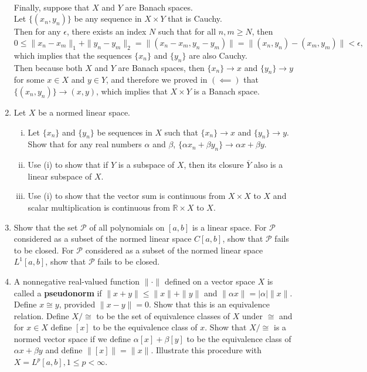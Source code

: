 \begin{enumerate}
    \\Finally, suppose that $X$ and $Y$ are Banach spaces.
    \\Let $\{(x_n,y_n)\}$ be any sequence in $X\times Y$ that is Cauchy.
    \\Then for any $\epsilon$, there exists an index $N$ such that for all $n,m\ge N$, then
    \[
        0\le\|x_n-x_m\|_1+\|y_n-y_m\|_2=\|(x_n-x_m,y_n-y_m)\|=\|(x_n,y_n)-(x_m,y_m)\|<\epsilon,
    \]
    which implies that the sequences $\{x_n\}$ and $\{y_n\}$ are also Cauchy.
    \\Then because both $X$ and $Y$ are Banach spaces, then $\{x_n\}\to x$ and $\{y_n\}\to y$ for some $x\in X$ and $y\in Y$, and therefore we proved in $(\impliedby)$ that $\{(x_n,y_n)\}\to(x,y)$, which implies that $X\times Y$ is a Banach space.
    \item Let $X$ be a normed linear space.
    \begin{enumerate}[(i)]
        \item Let $\{x_n\}$ and $\{y_n\}$ be sequences in $X$ such that $\{x_n\}\to x$ and $\{y_n\}\to y$.
        Show that for any real numbers $\alpha$ and $\beta$, $\{\alpha x_n+\beta y_n\}\to\alpha x+\beta y$.
        \item Use (i) to show that if $Y$ is a subspace of $X$, then its closure $\overline{Y}$ also is a linear subspace of $X$.
        \item Use (i) to show that the vector sum is continuous from $X\times X$ to $X$ and scalar multiplication is continuous from $\mathbb{R}\times X$ to $X$.
    \end{enumerate} 
    \item Show that the set $\mathcal{P}$ of all polynomials on $[a,b]$ is a linear space.
    For $\mathcal{P}$ considered as a subset of the normed linear space $C[a,b]$, show that $\mathcal{P}$ fails to be closed.
    For $\mathcal{P}$ considered as a subset of the normed linear space $L^1[a,b]$, show that $\mathcal{P}$ fails to be closed.
    \item A nonnegative real-valued function $\|\cdot\|$ defined on a vector space $X$ is called a \textbf{pseudonorm} if $\|x+y\|\le\|x\|+\|y\|$ and $\|\alpha x\|=|\alpha|\|x\|$.
    Define $x\cong y$, provided $\|x-y\|=0$.
    Show that this is an equivalence relation.
    Define $X/\cong$ to be the set of equivalence classes of $X$ under $\cong$ and for $x\in X$ define $[x]$ to be the equivalence class of $x$.
    Show that $X/\cong$ is a normed vector space if we define $\alpha[x]+\beta[y]$ to be the equivalence class of $\alpha x+\beta y$ and define $\|[x]\|=\|x\|$.
    Illustrate this procedure with $X=L^p[a,b],1\le p<\infty$.
\end{enumerate}

